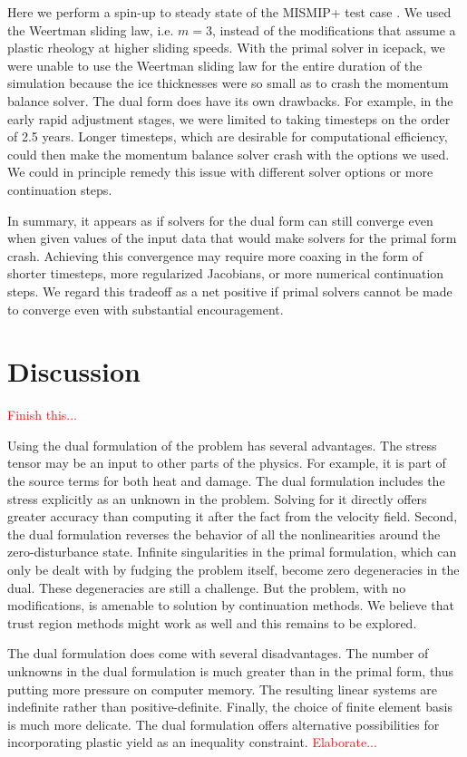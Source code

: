 \documentclass{article}
\theoremstyle{definition}
\theoremstyle{plain}
\begin{document}
Here we perform a spin-up to steady state of the MISMIP+ test case \citep{asay2016experimental}.
We used the Weertman sliding law, i.e. $m = 3$, instead of the modifications that assume a plastic rheology at higher sliding speeds.
With the primal solver in icepack, we were unable to use the Weertman sliding law for the entire duration of the simulation because the ice thicknesses were so small as to crash the momentum balance solver.
The dual form does have its own drawbacks.
For example, in the early rapid adjustment stages, we were limited to taking timesteps on the order of 2.5 years.
Longer timesteps, which are desirable for computational efficiency, could then make the momentum balance solver crash with the options we used.
We could in principle remedy this issue with different solver options or more continuation steps.

In summary, it appears as if solvers for the dual form can still converge even when given values of the input data that would make solvers for the primal form crash.
Achieving this convergence may require more coaxing in the form of shorter timesteps, more regularized Jacobians, or more numerical continuation steps.
We regard this tradeoff as a net positive if primal solvers cannot be made to converge even with substantial encouragement.


\section{Discussion}

\textcolor{red}{Finish this...}

Using the dual formulation of the problem has several advantages.
The stress tensor may be an input to other parts of the physics.
For example, it is part of the source terms for both heat and damage.
The dual formulation includes the stress explicitly as an unknown in the problem.
Solving for it directly offers greater accuracy than computing it after the fact from the velocity field.
Second, the dual formulation reverses the behavior of all the nonlinearities around the zero-disturbance state.
Infinite singularities in the primal formulation, which can only be dealt with by fudging the problem itself, become zero degeneracies in the dual.
These degeneracies are still a challenge.
But the problem, with no modifications, is amenable to solution by continuation methods.
We believe that trust region methods might work as well and this remains to be explored.

The dual formulation does come with several disadvantages.
The number of unknowns in the dual formulation is much greater than in the primal form, thus putting more pressure on computer memory.
The resulting linear systems are indefinite rather than positive-definite.
Finally, the choice of finite element basis is much more delicate.
The dual formulation offers alternative possibilities for incorporating plastic yield as an inequality constraint.
\textcolor{red}{Elaborate...}
\end{document}
